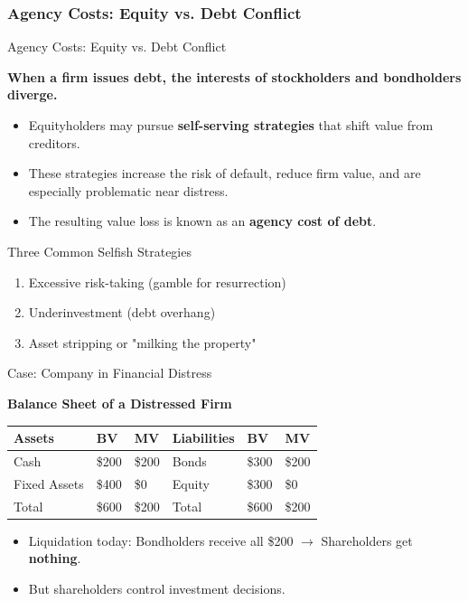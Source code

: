 \subsubsection{Agency Costs: Equity vs. Debt Conflict}
\begin{frame}{Agency Costs: Equity vs. Debt Conflict}
	
	\textbf{When a firm issues debt, the interests of stockholders and bondholders diverge.}
	
	\begin{itemize}
		\item Equityholders may pursue \textbf{self-serving strategies} that shift value from creditors.
		\item These strategies increase the risk of default, reduce firm value, and are especially problematic near distress.
		\item The resulting value loss is known as an \textbf{agency cost of debt}.
	\end{itemize}
	
	\vspace{0.3cm}
	\begin{block}{Three Common Selfish Strategies}
		\begin{enumerate}
			\item Excessive risk-taking (gamble for resurrection)
			\item Underinvestment (debt overhang)
			\item Asset stripping or "milking the property"
		\end{enumerate}
	\end{block}
	
\end{frame}

\begin{frame}{Case: Company in Financial Distress}
	
	\textbf{Balance Sheet of a Distressed Firm}
	
	\begin{table}
		\centering
		\begin{tabular}{@{}llllll@{}}
			\toprule
			Assets      & BV    & MV    & Liabilities & BV    & MV    \\ \midrule
			Cash        & \$200 & \$200 & Bonds       & \$300 & \$200 \\
			Fixed Assets & \$400 & \$0   & Equity      & \$300 & \$0   \\
			Total       & \$600 & \$200 & Total       & \$600 & \$200 \\ \bottomrule
		\end{tabular}
	\end{table}
	
	\begin{itemize}
		\item Liquidation today: Bondholders receive all \$200 $\rightarrow$ Shareholders get \textbf{nothing}.
		\item But shareholders control investment decisions.
	\end{itemize}
	
\end{frame}

